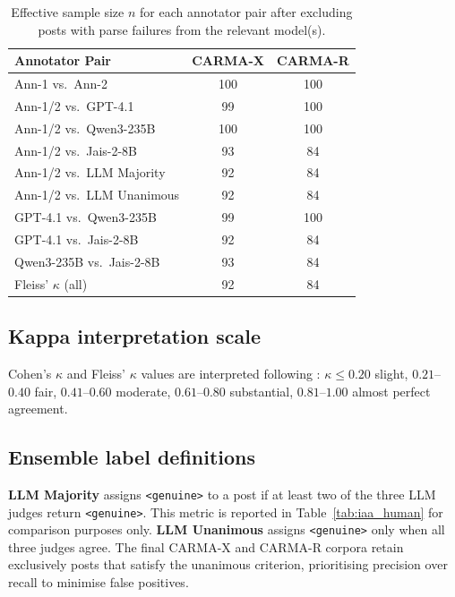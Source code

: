 \documentclass[11pt]{article}
\begin{document}
\begin{table}[h]
\centering
\small
\begin{tabular}{lcc}
\toprule
\textbf{Annotator Pair} & \textbf{CARMA-X} & \textbf{CARMA-R} \\
\midrule
Ann-1 vs.\ Ann-2          & 100 & 100 \\
\midrule
Ann-1/2 vs.\ GPT-4.1      &  99 & 100 \\
Ann-1/2 vs.\ Qwen3-235B   & 100 & 100 \\
Ann-1/2 vs.\ Jais-2-8B    &  93 &  84 \\
Ann-1/2 vs.\ LLM Majority &  92 &  84 \\
Ann-1/2 vs.\ LLM Unanimous&  92 &  84 \\
\midrule
GPT-4.1 vs.\ Qwen3-235B   &  99 & 100 \\
GPT-4.1 vs.\ Jais-2-8B    &  92 &  84 \\
Qwen3-235B vs.\ Jais-2-8B &  93 &  84 \\
\midrule
Fleiss' $\kappa$ (all)     &  92 &  84 \\
\bottomrule
\end{tabular}
\caption{Effective sample size $n$ for each annotator pair after
excluding posts with parse failures from the relevant model(s).}
\label{tab:sample_sizes}
\end{table}

\subsection*{Kappa interpretation scale}

Cohen's $\kappa$ and Fleiss' $\kappa$ values are interpreted following
\citet{landis1977measurement}: $\kappa \leq 0.20$ slight,
$0.21$--$0.40$ fair, $0.41$--$0.60$ moderate, $0.61$--$0.80$
substantial, $0.81$--$1.00$ almost perfect agreement.

\subsection*{Ensemble label definitions}

\textbf{LLM Majority} assigns \texttt{<genuine>} to a post if at least
two of the three LLM judges return \texttt{<genuine>}. This metric is
reported in Table~\ref{tab:iaa_human} for comparison purposes only.
\textbf{LLM Unanimous} assigns \texttt{<genuine>} only when all three
judges agree. The final CARMA-X and CARMA-R corpora retain exclusively
posts that satisfy the unanimous criterion, prioritising precision over
recall to minimise false positives.
\end{document}

